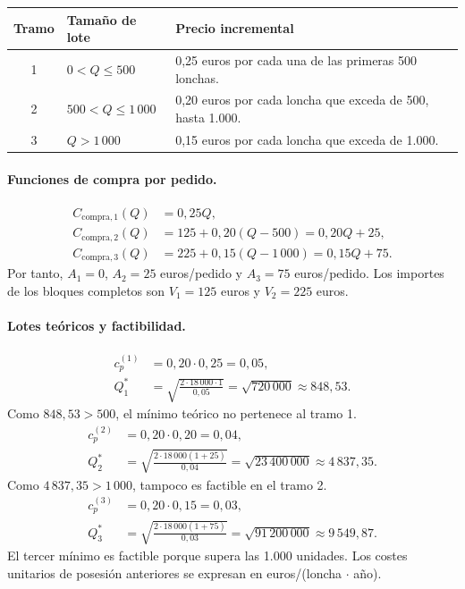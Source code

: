 \documentclass[11pt,a4paper]{article}
\begin{document}
\begin{center}
    \renewcommand{\arraystretch}{1.2}
    \begin{tabularx}{\textwidth}{@{}clX@{}}
        \toprule
        Tramo & Tamaño de lote    & Precio incremental                                         \\
        \midrule
        1     & $0<Q\leq500$      & 0,25 euros por cada una de las primeras 500 lonchas.       \\
        2     & $500<Q\leq1\,000$ & 0,20 euros por cada loncha que exceda de 500, hasta 1.000. \\
        3     & $Q>1\,000$        & 0,15 euros por cada loncha que exceda de 1.000.            \\
        \bottomrule
    \end{tabularx}
\end{center}

\paragraph{Funciones de compra por pedido.}
\begin{align*}
    C_{\text{compra},1}(Q) & =0{,}25Q,             \\
    C_{\text{compra},2}(Q) & =125+0{,}20(Q-500)
    =\boxed{0{,}20Q+25},                           \\
    C_{\text{compra},3}(Q) & =225+0{,}15(Q-1\,000)
    =\boxed{0{,}15Q+75}.
\end{align*}
Por tanto, $A_1=0$, $A_2=25$ euros/pedido y $A_3=75$ euros/pedido. Los importes de los bloques completos son $V_1=125$ euros y $V_2=225$ euros.

\paragraph{Lotes teóricos y factibilidad.}
\begin{align*}
    c_p^{(1)} & =0{,}20\cdot0{,}25=0{,}05,                 \\
    Q_1^{*}   & =\sqrt{\frac{2\cdot18\,000\cdot1}{0{,}05}}
    =\sqrt{720\,000}\approx848{,}53.
\end{align*}
Como $848{,}53>500$, el mínimo teórico no pertenece al tramo 1.
\begin{align*}
    c_p^{(2)} & =0{,}20\cdot0{,}20=0{,}04,                 \\
    Q_2^{*}   & =\sqrt{\frac{2\cdot18\,000(1+25)}{0{,}04}}
    =\sqrt{23\,400\,000}\approx4\,837{,}35.
\end{align*}
Como $4\,837{,}35>1\,000$, tampoco es factible en el tramo 2.
\begin{align*}
    c_p^{(3)} & =0{,}20\cdot0{,}15=0{,}03,                 \\
    Q_3^{*}   & =\sqrt{\frac{2\cdot18\,000(1+75)}{0{,}03}}
    =\sqrt{91\,200\,000}\approx9\,549{,}87.
\end{align*}
El tercer mínimo es factible porque supera las 1.000 unidades. Los costes unitarios de posesión anteriores se expresan en euros/(loncha $\cdot$ año).
\end{document}
